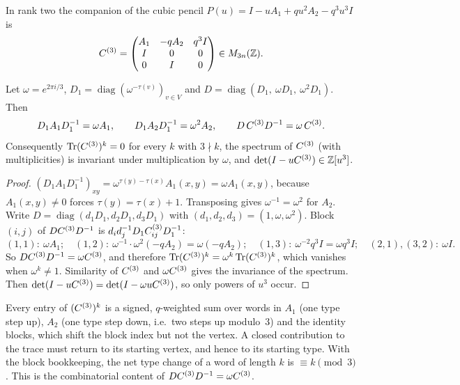 In rank two the companion of the cubic pencil
$P(u)=I-uA_1+qu^{2}A_2-q^{3}u^{3}I$ is
\begin{equation}\label{V3P1:eq:C}
C^{(3)}=\begin{pmatrix}A_1&-qA_2&q^{3}I\\ I&0&0\\ 0&I&0\end{pmatrix}\in M_{3n}(\mathbb{Z}).
\end{equation}

\begin{proposition}\label{V3P1:prop:grading}
Let $\omega=e^{2\pi i/3}$, $D_1=\operatorname{diag}(\omega^{-\tau(v)})_{v\in V}$ and
$D=\operatorname{diag}(D_1,\ \omega D_1,\ \omega^{2}D_1)$. Then
\[
D_1A_1D_1^{-1}=\omega A_1,\qquad D_1A_2D_1^{-1}=\omega^{2}A_2,\qquad D\,C^{(3)} D^{-1}=\omega\,C^{(3)} .
\]
Consequently $\operatorname{Tr}(C^{(3)})^{k}=0$ for every $k$ with $3\nmid k$, the spectrum of $C^{(3)}$
\textup{(}with multiplicities\textup{)} is invariant under multiplication by $\omega$, and
$\det(I-uC^{(3)})\in\mathbb{Z}[u^{3}]$.
\end{proposition}

\begin{proof}
$(D_1A_1D_1^{-1})_{xy}=\omega^{\tau(y)-\tau(x)}A_1(x,y)=\omega A_1(x,y)$, because $A_1(x,y)\neq0$
forces $\tau(y)=\tau(x)+1$. Transposing gives $\omega^{-1}=\omega^{2}$ for $A_2$. Write
$D=\operatorname{diag}(d_1D_1,d_2D_1,d_3D_1)$ with $(d_1,d_2,d_3)=(1,\omega,\omega^{2})$.
Block $(i,j)$ of $DC^{(3)} D^{-1}$ is $d_id_j^{-1}D_1C^{(3)}_{ij}D_1^{-1}$:
\[
(1,1)\colon\ \omega A_1;\quad
(1,2)\colon\ \omega^{-1}\cdot\omega^{2}(-qA_2)=\omega(-qA_2);\quad
(1,3)\colon\ \omega^{-2}q^{3}I=\omega q^{3}I;\quad
(2,1),(3,2)\colon\ \omega I .
\]
So $DC^{(3)} D^{-1}=\omega C^{(3)}$, and therefore $\operatorname{Tr}(C^{(3)})^{k}=\omega^{k}\operatorname{Tr}(C^{(3)})^{k}$,
which vanishes when $\omega^{k}\neq1$. Similarity of $C^{(3)}$ and $\omega C^{(3)}$ gives the
invariance of the spectrum. Then $\det(I-uC^{(3)})=\det(I-\omega uC^{(3)})$, so only powers
of $u^{3}$ occur.
\end{proof}

\begin{remark}\label{V3P1:rem:walks}
Every entry of $(C^{(3)})^{k}$ is a signed, $q$-weighted sum over words in $A_1$ (one type
step up), $A_2$ (one type step down, i.e.\ two steps up modulo~$3$) and the identity blocks,
which shift the block index but not the vertex. A closed contribution to the trace must
return to its starting vertex, and hence to its starting type. With the block bookkeeping,
the net type change of a word of length $k$ is $\equiv k\pmod 3$. This is the combinatorial
content of $DC^{(3)} D^{-1}=\omega C^{(3)}$.
\end{remark}

